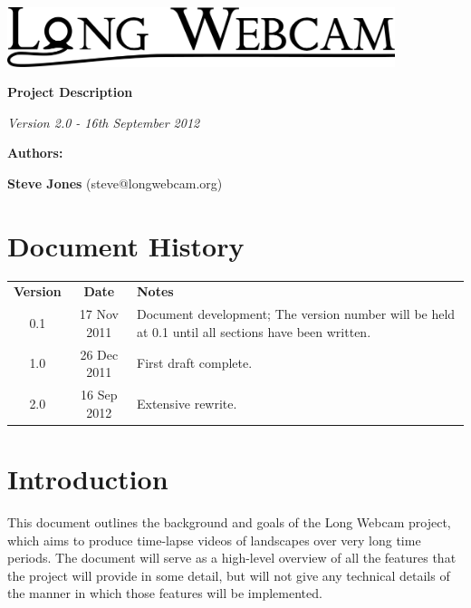 \documentclass[11pt,a4paper]{article}
\begin{document}
\begin{titlepage}
\begin{center}

\includegraphics[width=0.85\textwidth]{./Logo_Large-cropped_black.png}

\vspace{3 cm}

\textbf{\Huge{Project Description}}

\vspace{1 cm}

\textit{\large{Version 2.0 - 16th September 2012}}

\vspace{4 cm}

\textbf{\Large{Authors:}}

\textbf{Steve Jones} (steve@longwebcam.org)

\end{center}

\end{titlepage}

\tableofcontents
\clearpage
{}
\section*{Document History}
\begin{table}[tbhp!]
\begin{tabular}{ c c p{9.9cm} }
\textbf{Version} & \textbf{Date} & \textbf{Notes} \\
0.1 & 17 Nov 2011 & Document development; The version number will be held at 0.1 until all sections have been written. \\
1.0 & 26 Dec 2011 & First draft complete. \\
2.0 & 16 Sep 2012 & Extensive rewrite.
\end{tabular}
\end{table}


\clearpage
{}
\section{Introduction}
This document outlines the background and goals of the Long Webcam project, which aims to produce time-lapse videos of landscapes over very long time periods. The document will serve as a high-level overview of all the features that the project will provide in some detail, but will not give any technical details of the manner in which those features will be implemented.
\end{document}
